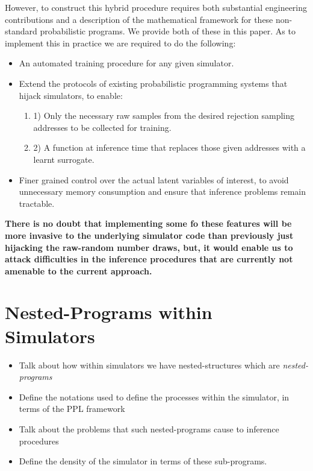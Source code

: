 \documentclass{article}
\begin{document}
However, to construct this hybrid procedure requires both substantial engineering contributions 
and a description of the mathematical framework for these non-standard probabilistic programs. 
We provide both of these in this paper. As to implement this in practice we are required to do the following:
 \begin{itemize}
    \item An automated training procedure for any given simulator.
    \item Extend the protocols of existing probabilistic programming systems that hijack simulators, to enable:
    \begin{enumerate} \item 1) Only the necessary raw samples from the desired rejection sampling addresses to be collected for training.
                       \item 2) A function at inference time that replaces those given addresses with a learnt surrogate.
    \end{enumerate}
    \item Finer grained control over the actual latent variables of interest, to avoid unnecessary memory consumption and ensure that inference problems remain tractable.
  \end{itemize}

\textbf{There is no doubt that implementing some fo these features will be more invasive to the underlying simulator code than previously
just hijacking the raw-random number draws, but, it would enable us to attack difficulties in the inference procedures that are
currently not amenable to the current approach.}

\section{Nested-Programs within Simulators}

\begin{itemize}
  \item Talk about how within simulators we have nested-structures which are \emph{nested-programs}
  \item Define the notations used to define the processes within the simulator, in terms of the PPL framework
  \item Talk about the problems that such nested-programs cause to inference procedures
  \item Define the density of the simulator in terms of these sub-programs. 
\end{itemize}
\end{document}
